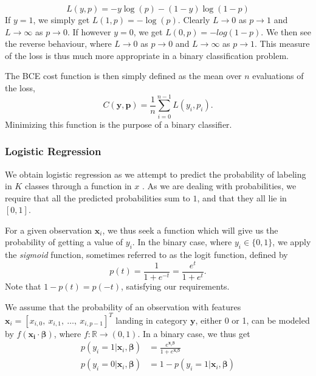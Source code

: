 \documentclass{article}
\theoremstyle{definition}
\begin{document}
\begin{equation*}
    L(y, p) = -y \log(p) - (1 - y)\log(1-p)
\end{equation*}
If $y=1$, we simply get $L(1,p) = -\log(p)$. Clearly $L \to 0$ as $p \to 1$ and $L \to \infty$ as $p \to 0$.
If however $y = 0$, we get $L(0,p) = -log(1-p)$. We then see the reverse behaviour, where $L \to 0$ as $p \to 0$ and $L \to \infty$ as $p \to 1$. This measure of the loss is thus much more appropriate in a binary classification problem.

The BCE cost function is then simply defined as the mean over $n$ evaluations of the loss, 
\begin{equation*}
    C(\boldsymbol{y}, \boldsymbol{p}) = \frac{1}{n} \sum_{i=0}^{n-1} L(y_i, p_i).
\end{equation*}
Minimizing this function is the purpose of a binary classifier.

\subsubsection{Logistic Regression}
We obtain logistic regression as we attempt to predict the probability of labeling in $K$ classes through a function in $x$ \parencite[p.~119]{Hastie2009}. As we are dealing with probabilities, we require that all the predicted probabilities sum to $1$, and that they all lie in $[0, 1]$.

For a given observation $\boldsymbol{x}_i$, we thus seek a function which will give us the probability of getting a value of $y_i$. In the binary case, where $y_i \in \{0, 1\}$, we apply the \textit{sigmoid} function, sometimes referred to as the logit function, defined by
\begin{equation*}
    p(t) = \frac{1}{1 + e^{-t}} = \frac{e^t}{1 + e^t}.
\end{equation*}
Note that $1 - p(t) = p(-t)$, satisfying our requirements.

We assume that the probability of an observation with features $\boldsymbol{x}_i = \left[x_{i,0}, \ x_{i, 1}, \ \ldots, \ x_{i, p-1} \right]^T$ landing in category $\boldsymbol{y}$, either 0 or 1, can be modeled by $f(\mathbf{x_i} \cdot \boldsymbol{\beta})$, where $f: \mathbb{R} \to (0, 1)$. In a binary case, we thus get
\begin{align*}
    p\left( y_i = 1 | \boldsymbol{x}_i, \boldsymbol{\beta} \right) &= \frac{ e^{\boldsymbol{x}_i \boldsymbol{\beta}}}{1 + e^{\boldsymbol{x}_i \boldsymbol{\beta}}} \\
    p\left( y_i = 0 | \boldsymbol{x}_i, \boldsymbol{\beta} \right) &= 1 - p\left( y_i = 1 | \boldsymbol{x}_i, \boldsymbol{\beta} \right)
\end{align*}
\end{document}
